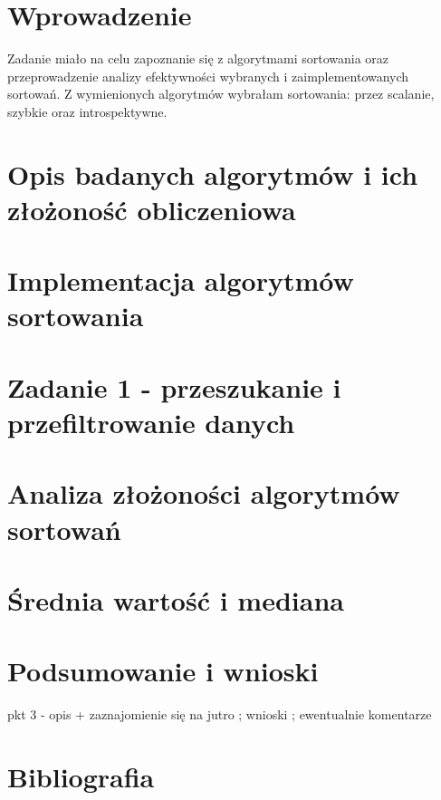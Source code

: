 \documentclass[12pt]{article}
\begin{document}
\renewcommand{\figurename}{Rys.}
\renewcommand{\tablename}{Tab.}
    

\tableofcontents
\newpage

\section{Wprowadzenie}
Zadanie miało na celu zapoznanie się z algorytmami sortowania oraz przeprowadzenie analizy efektywności wybranych i zaimplementowanych sortowań. Z wymienionych algorytmów wybrałam sortowania: przez scalanie, szybkie oraz introspektywne. 

\section{Opis badanych algorytmów i ich złożoność obliczeniowa}


\section{Implementacja algorytmów sortowania}


\section{Zadanie 1 - przeszukanie i przefiltrowanie danych}


\section{Analiza złożoności algorytmów sortowań}


\section{Średnia wartość i mediana}



\section{Podsumowanie i wnioski}


\colorbox{WildStrawberry}{pkt 3 - opis + zaznajomienie się na jutro ; wnioski ; ewentualnie komentarze }

\section{Bibliografia}
\end{document}
